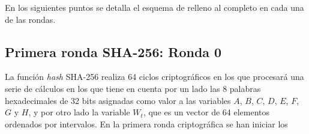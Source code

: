 \documentclass{article}
\begin{document}
    En los siguientes puntos se detalla el esquema de relleno al completo en cada una de las rondas.
    
    \subsection{Primera ronda SHA-256: Ronda 0}
    La función \textit{hash} SHA-256 realiza 64 ciclos criptográficos en los que procesará una serie de cálculos en los que tiene en cuenta por un lado las 8 palabras hexadecimales de 32 bits asignadas como valor a las variables $A$, $B$, $C$, $D$, $E$, $F$, $G$ y $H$, y por otro lado la variable $W_t$, que es un vector de 64 elementos ordenados por intervalos. En la primera ronda criptográfica se han iniciar los
    
    \vspace{3mm}
    
\end{document}
